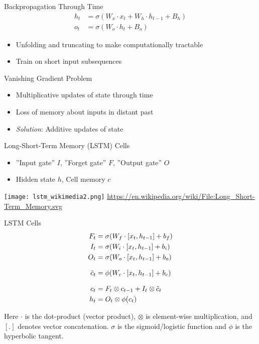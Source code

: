 \documentclass[ignorenonframetext,xcolor=x11names]{beamer}
\begin{document}
\begin{frame}{Backpropagation Through Time}
\begin{align*}
h_t &= \sigma ( W_{x} \cdot x_t + W_{h} \cdot h_{t-1} + B_{h}) \\
o_t &= \sigma (W_{o} \cdot h_t + B_{o} ) 
\end{align*}

\begin{itemize}
   \item Unfolding and truncating to make computationally tractable
   \item Train on short input subsequences
\end{itemize}

\begin{block}{Vanishing Gradient Problem}
\begin{itemize}
   \item Multiplicative updates of state through time
   \item Loss of memory about inputs in distant past
   \item \emph{Solution}: Additive updates of state
\end{itemize}
\end{block}
\end{frame}

\begin{frame}{Long-Short-Term Memory (LSTM) Cells}
\begin{itemize}
   \item ''Input gate'' $I$, ''Forget gate'' $F$, ''Output gate'' $O$
   \item Hidden state $h$, Cell memory $c$
\end{itemize}

\begin{center}
\texttt{[image: lstm\_wikimedia2.png]}
\scriptsize \url{https://en.wikipedia.org/wiki/File:Long_Short-Term_Memory.svg} \normalsize
\end{center}
\end{frame}

\begin{frame}{LSTM Cells}
\begin{align*}
F_t &= \sigma (W_f \cdot [ x_t, h_{t-1}] + b_f) \\
I_t &= \sigma (W_i \cdot [ x_t, h_{t-1}] + b_i) \\
O_t &= \sigma (W_o \cdot [ x_t, h_{t-1}] + b_o) \\[.5\baselineskip]
\tilde{c}_t &= \phi (W_c \cdot [ x_t, h_{t-1}] + b_c) \\[.5\baselineskip]
c_t &= F_t \otimes c_{t-1} + I_t \otimes \tilde{c}_t \\
h_t &= O_t \otimes \phi(c_t) 
\end{align*}

\small
Here $\cdot$ is the dot-product (vector product), $\otimes$ is element-wise multiplication, and $[.]$ denotes vector concatenation. $\sigma$ is the sigmoid/logistic function and $\phi$ is the hyperbolic tangent.
\end{frame}
\end{document}
